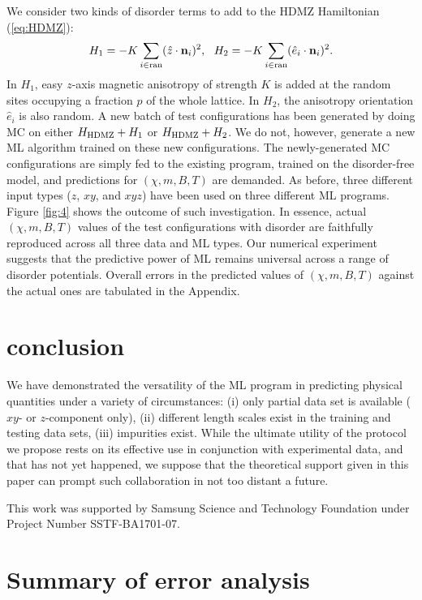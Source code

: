 \documentclass[reprint,amsmath,amssymb,aps,showpacs,superscriptaddress,prb]{revtex4-1}
\newcommand{\ba}{\begin{eqnarray}}
\newcommand{\ea}{\end{eqnarray}}
\renewcommand{\v}[1]{{\bf #1}}
\begin{document}
We consider two kinds of disorder terms to add to the HDMZ Hamiltonian (\ref{eq:HDMZ}):
%
\ba H_{1} = -K \sum_{i \in {\rm ran}} (\hat{z} \cdot \v n_i )^2 , ~~ H_2 = - K \sum_{i \in {\rm ran}} (\hat{e}_i \cdot \v n_i )^2 .  \ea
%
In $H_1$, easy $z$-axis magnetic anisotropy of strength $K$ is added at the random sites occupying a fraction $p$ of the whole lattice. In $H_2$, the anisotropy orientation $\hat{e}_i$ is also random. A new batch of test configurations has been generated by doing MC on either  $H_{\rm HDMZ} + H_1$ or $H_{\rm HDMZ} + H_2$. We do not, however, generate a new ML algorithm trained on these new configurations. The newly-generated MC configurations are simply fed to the existing program, trained on the disorder-free model, and predictions for $(\chi, m, B, T)$ are demanded. As before, three different input types ($z$, $xy$, and $xyz$) have been used on three different ML programs. Figure \ref{fig:4} shows the outcome of such investigation. In essence, actual $(\chi, m, B, T)$ values of the test configurations with disorder are faithfully reproduced across all three data and ML types. Our numerical experiment suggests that the predictive power of ML remains universal across a range of disorder potentials. Overall errors in the predicted values of $(\chi, m, B, T)$ against the actual ones are tabulated in the Appendix.

\section{conclusion}

We have demonstrated the versatility of the ML program in predicting physical quantities under a variety of circumstances: (i) only partial data set is available ($xy$- or $z$-component only), (ii) different length scales exist in the training and testing data sets, (iii) impurities exist. While the ultimate utility of the protocol we propose rests on its effective use in conjunction with experimental data, and that has not yet happened, we suppose that the theoretical support given in this paper can prompt such collaboration in not too distant a future.

\acknowledgments
This work was supported by Samsung Science and Technology Foundation under Project Number SSTF-BA1701-07.


\appendix
\section{Summary of error analysis}
\end{document}
